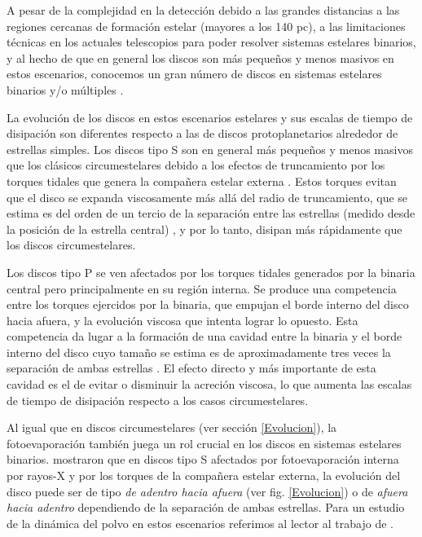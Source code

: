 \documentclass[baaa]{baaa}
\begin{document}
A pesar de la complejidad en la detecci\'on debido a las grandes distancias a las regiones cercanas de formaci\'on estelar (mayores a los 140 pc), a las limitaciones t\'ecnicas en los actuales telescopios para poder resolver sistemas estelares binarios, y al hecho de que en general los discos son m\'as peque\~nos y menos masivos en estos escenarios, conocemos un gran n\'umero de discos en sistemas estelares binarios y/o m\'ultiples \citep[ver detalles en el reciente art\'iculo de revisi\'on][]{Zurlo2023}.

La evoluci\'on de los discos en estos escenarios estelares y sus escalas de tiempo de disipaci\'on son diferentes respecto a las de discos protoplanetarios alrededor de estrellas simples. Los discos tipo S son en general m\'as peque\~nos y menos masivos que los cl\'asicos circumestelares debido a los efectos de truncamiento por los torques tidales que genera la compa\~nera estelar externa \citep{ArtymowiczLubow1994}. Estos torques evitan que el disco se expanda viscosamente m\'as all\'a del radio de truncamiento, que se estima es del orden de un tercio de la separaci\'on entre las estrellas (medido desde la posici\'on de la estrella central) \citep{PapaloizouPringle1977}, y por lo tanto, disipan m\'as r\'apidamente que los discos circumestelares. 

Los discos tipo P se ven afectados por los torques tidales generados por la binaria central pero principalmente en su regi\'on interna. Se produce una competencia entre los torques ejercidos por la binaria, que empujan el borde interno del disco hacia afuera, y la evoluci\'on viscosa que intenta lograr lo opuesto. Esta competencia da lugar a la formaci\'on de una cavidad entre la binaria y el borde interno del disco cuyo tama\~no se estima es de aproximadamente tres veces la separaci\'on de ambas estrellas \citep{ArtymowiczLubow1994,ArtymowiczLubow1996}. El efecto directo y m\'as importante de esta cavidad es el de evitar o disminuir la acreci\'on viscosa, lo que aumenta las escalas de tiempo de disipaci\'on respecto a los casos circumestelares.

Al igual que en discos circumestelares (ver secci\'on \ref{Evolucion}), la fotoevaporaci\'on tambi\'en juega un rol crucial en los discos en sistemas estelares binarios. \citet{Rosotti2018} mostraron que en discos tipo S afectados por fotoevaporaci\'on interna por rayos-X y por los torques de la compa\~nera estelar externa, la evoluci\'on del disco puede ser de tipo \textit{de adentro hacia afuera} (ver fig. \ref{Evolucion}) o de \textit{afuera hacia adentro} dependiendo de la separaci\'on de ambas estrellas. Para un estudio de la din\'amica del polvo en estos escenarios referimos al lector al trabajo de \citet{Zagaria2023}.
\end{document}
